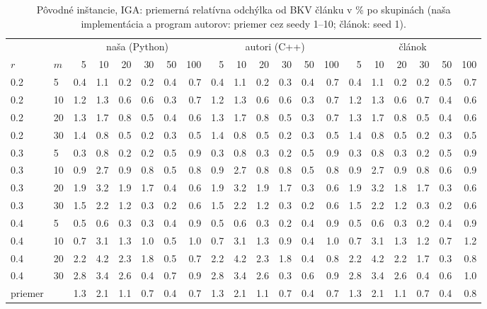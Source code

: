 \begin{table}[ht]
\centering
\scriptsize
\setlength{\tabcolsep}{3pt}
\caption{Pôvodné inštancie, IGA: priemerná relatívna odchýlka od BKV článku v \% po skupinách (naša implementácia a program autorov: priemer cez seedy 1--10; článok: seed 1).}
\label{tab:orig_rpd_iga}
\begin{tabular}{ll|rrrrrr|rrrrrr|rrrrrr}
\toprule
 &  & \multicolumn{6}{c}{naša (Python)} & \multicolumn{6}{c}{autori (C++)} & \multicolumn{6}{c}{článok} \\
$r$ & $m$ & 5 & 10 & 20 & 30 & 50 & 100 & 5 & 10 & 20 & 30 & 50 & 100 & 5 & 10 & 20 & 30 & 50 & 100 \\
\midrule
0.2 & 5 & 0.4 & 1.1 & 0.2 & 0.2 & 0.4 & 0.7 & 0.4 & 1.1 & 0.2 & 0.3 & 0.4 & 0.7 & 0.4 & 1.1 & 0.2 & 0.2 & 0.5 & 0.7 \\
0.2 & 10 & 1.2 & 1.3 & 0.6 & 0.6 & 0.3 & 0.7 & 1.2 & 1.3 & 0.6 & 0.6 & 0.3 & 0.7 & 1.2 & 1.3 & 0.6 & 0.7 & 0.4 & 0.6 \\
0.2 & 20 & 1.3 & 1.7 & 0.8 & 0.5 & 0.4 & 0.6 & 1.3 & 1.7 & 0.8 & 0.5 & 0.3 & 0.7 & 1.3 & 1.7 & 0.8 & 0.5 & 0.4 & 0.6 \\
0.2 & 30 & 1.4 & 0.8 & 0.5 & 0.2 & 0.3 & 0.5 & 1.4 & 0.8 & 0.5 & 0.2 & 0.3 & 0.5 & 1.4 & 0.8 & 0.5 & 0.2 & 0.3 & 0.5 \\
0.3 & 5 & 0.3 & 0.8 & 0.2 & 0.2 & 0.5 & 0.9 & 0.3 & 0.8 & 0.3 & 0.2 & 0.5 & 0.9 & 0.3 & 0.8 & 0.3 & 0.2 & 0.5 & 0.9 \\
0.3 & 10 & 0.9 & 2.7 & 0.9 & 0.8 & 0.5 & 0.8 & 0.9 & 2.7 & 0.8 & 0.8 & 0.5 & 0.8 & 0.9 & 2.7 & 0.9 & 0.8 & 0.6 & 0.9 \\
0.3 & 20 & 1.9 & 3.2 & 1.9 & 1.7 & 0.4 & 0.6 & 1.9 & 3.2 & 1.9 & 1.7 & 0.3 & 0.6 & 1.9 & 3.2 & 1.8 & 1.7 & 0.3 & 0.6 \\
0.3 & 30 & 1.5 & 2.2 & 1.2 & 0.3 & 0.2 & 0.6 & 1.5 & 2.2 & 1.2 & 0.3 & 0.2 & 0.6 & 1.5 & 2.2 & 1.2 & 0.3 & 0.2 & 0.6 \\
0.4 & 5 & 0.5 & 0.6 & 0.3 & 0.3 & 0.4 & 0.9 & 0.5 & 0.6 & 0.3 & 0.2 & 0.4 & 0.9 & 0.5 & 0.6 & 0.3 & 0.2 & 0.4 & 0.9 \\
0.4 & 10 & 0.7 & 3.1 & 1.3 & 1.0 & 0.5 & 1.0 & 0.7 & 3.1 & 1.3 & 0.9 & 0.4 & 1.0 & 0.7 & 3.1 & 1.3 & 1.2 & 0.7 & 1.2 \\
0.4 & 20 & 2.2 & 4.2 & 2.3 & 1.8 & 0.5 & 0.7 & 2.2 & 4.2 & 2.3 & 1.8 & 0.4 & 0.8 & 2.2 & 4.2 & 2.2 & 1.7 & 0.3 & 0.8 \\
0.4 & 30 & 2.8 & 3.4 & 2.6 & 0.4 & 0.7 & 0.9 & 2.8 & 3.4 & 2.6 & 0.3 & 0.6 & 0.9 & 2.8 & 3.4 & 2.6 & 0.4 & 0.6 & 1.0 \\
\midrule
priemer &  & 1.3 & 2.1 & 1.1 & 0.7 & 0.4 & 0.7 & 1.3 & 2.1 & 1.1 & 0.7 & 0.4 & 0.7 & 1.3 & 2.1 & 1.1 & 0.7 & 0.4 & 0.8 \\
\bottomrule
\end{tabular}
\end{table}
